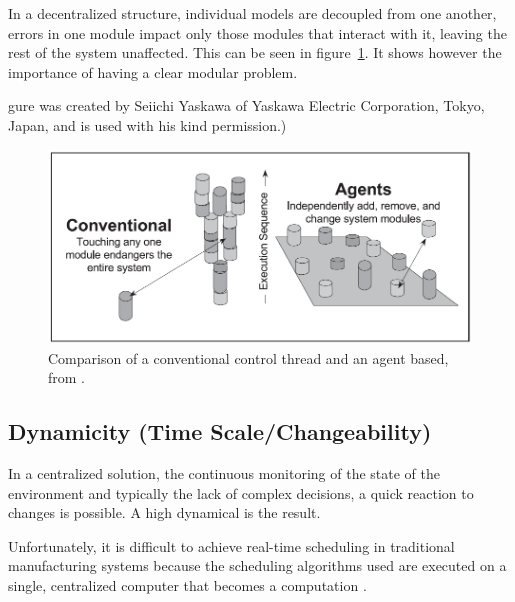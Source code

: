 In a decentralized structure, individual models are decoupled from one another, errors in one module impact only those modules that interact with it, leaving the rest of the system unaffected. This can be seen in figure~\ref{fig:modularitydecentral-changeability}. It shows however the importance of having a clear modular problem. 

gure was created by Seiichi Yaskawa of Yaskawa Electric Corporation, Tokyo, Japan, and is used with his kind permission.)

\begin{figure}[h]
\centering
\includegraphics[width=0.7\linewidth]{img/modularity+decentral-changeability}
\caption{Comparison of a conventional control thread and an agent based, from \citet{parunak1999industrial}.}
\label{fig:modularitydecentral-changeability}
\end{figure}



\subsection{Dynamicity (Time Scale/Changeability)}
In a centralized solution, the continuous monitoring of the state of the environment and typically the lack of complex decisions, a quick reaction to changes is possible. A high dynamical is the result. 

Unfortunately, it is difficult to achieve real-time scheduling in traditional manufacturing systems because the scheduling algorithms used are executed on a single, centralized computer that becomes a computation \citep{duffie1994real}.
